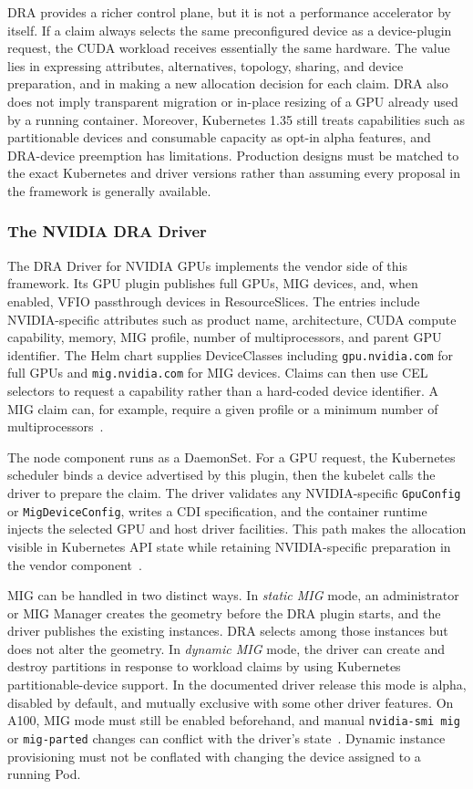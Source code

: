 DRA provides a richer control plane, but it is not a performance accelerator by itself. If a claim always selects the same preconfigured device as a device-plugin request, the CUDA workload receives essentially the same hardware. The value lies in expressing attributes, alternatives, topology, sharing, and device preparation, and in making a new allocation decision for each claim. DRA also does not imply transparent migration or in-place resizing of a GPU already used by a running container. Moreover, Kubernetes 1.35 still treats capabilities such as partitionable devices and consumable capacity as opt-in alpha features, and DRA-device preemption has limitations. Production designs must be matched to the exact Kubernetes and driver versions rather than assuming every proposal in the framework is generally available.

\subsubsection{The NVIDIA DRA Driver}

The DRA Driver for NVIDIA GPUs implements the vendor side of this framework. Its GPU plugin publishes full GPUs, MIG devices, and, when enabled, VFIO passthrough devices in ResourceSlices. The entries include NVIDIA-specific attributes such as product name, architecture, CUDA compute capability, memory, MIG profile, number of multiprocessors, and parent GPU identifier. The Helm chart supplies DeviceClasses including \texttt{gpu.nvidia.com} for full GPUs and \texttt{mig.nvidia.com} for MIG devices. Claims can then use CEL selectors to request a capability rather than a hard-coded device identifier. A MIG claim can, for example, require a given profile or a minimum number of multiprocessors~\cite{nvidia2026dradriver,nvidia2026draattributes}.

The node component runs as a DaemonSet. For a GPU request, the Kubernetes scheduler binds a device advertised by this plugin, then the kubelet calls the driver to prepare the claim. The driver validates any NVIDIA-specific \texttt{GpuConfig} or \texttt{MigDeviceConfig}, writes a CDI specification, and the container runtime injects the selected GPU and host driver facilities. This path makes the allocation visible in Kubernetes API state while retaining NVIDIA-specific preparation in the vendor component~\cite{nvidia2026dradriverarchitecture}.

MIG can be handled in two distinct ways. In \emph{static MIG} mode, an administrator or MIG Manager creates the geometry before the DRA plugin starts, and the driver publishes the existing instances. DRA selects among those instances but does not alter the geometry. In \emph{dynamic MIG} mode, the driver can create and destroy partitions in response to workload claims by using Kubernetes partitionable-device support. In the documented driver release this mode is alpha, disabled by default, and mutually exclusive with some other driver features. On A100, MIG mode must still be enabled beforehand, and manual \texttt{nvidia-smi mig} or \texttt{mig-parted} changes can conflict with the driver's state~\cite{nvidia2026drivermig}. Dynamic instance provisioning must not be conflated with changing the device assigned to a running Pod.

